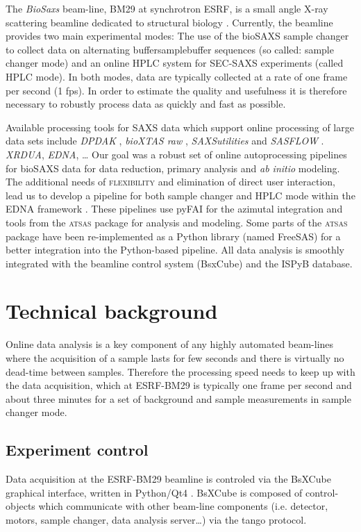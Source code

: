 \documentclass[preprint,pdf]{iucr}              %
\begin{document}
The \textit{BioSaxs} beam-line, BM29 at synchrotron ESRF, is a small angle X-ray
scattering beamline dedicated to structural biology \cite{BM29paper}.
Currently, the beamline provides two main experimental modes: The use of the
bioSAXS sample changer to collect data on alternating buffer\/sample\/buffer
sequences (so called: sample changer mode) and an online HPLC system for
SEC-SAXS experiments (called HPLC mode).
In both modes, data are typically collected at a rate of one frame per second
(1 fps).
In order to estimate the quality and usefulness it is therefore necessary to
robustly process data as quickly and fast as possible.

Available processing tools for SAXS data which support online processing of
large data sets include \textit{DPDAK} \cite{DPDAK}, \textit{bioXTAS raw}
\cite{BioXTASraw}, \textit{SAXSutilities} \cite{SAXSUtilities} and
\textit{SASFLOW} \cite{X33P,P12}.  \textit{XRDUA}, \textit{EDNA}, \ldots
Our goal was a robust set of online autoprocessing pipelines for bioSAXS data
for data reduction, primary analysis and \textit{ab initio} modeling.
The additional needs of \textsc{flexibility} and elimination of
direct user interaction, lead us to develop a pipeline for both sample changer and HPLC mode within the
EDNA framework \cite{edna}.
These pipelines use pyFAI for the azimutal integration \cite{pyFAI} and tools
from the \textsc{atsas} package \cite{ATSAS1, ATSAS2} for analysis and modeling.
Some parts of the \textsc{atsas} package have been re-implemented as a Python
library (named FreeSAS) for a better integration into the Python-based pipeline. 
All data analysis is smoothly integrated with the beamline control system
(BsxCube) and the ISPyB database.

\section{Technical background}

Online data analysis is a key component of any highly automated beam-lines
where the acquisition of a sample lasts for few seconds and there is
virtually no dead-time between samples.
Therefore the processing speed needs to keep up with the data acquisition, which
at ESRF-BM29 is typically one frame per second and about three minutes for a set
of background and sample measurements in sample changer mode.


\subsection{Experiment control}
Data acquisition at the ESRF-BM29 beamline is controled via the BsXCube
graphical interface, written in Python/Qt4 \cite{pyqt}.
BsXCube is composed of control-objects which communicate with other beam-line
components (i.e. detector, motors, sample changer, data analysis server\ldots)
via the tango protocol\cite{tango}.
\end{document}
